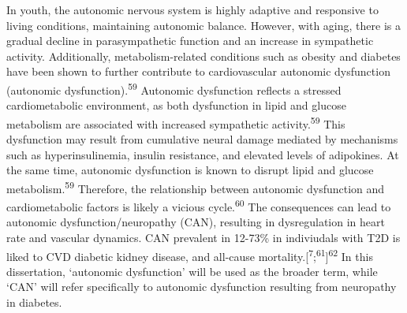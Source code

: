 \documentclass[
  letterpaper,
  headsepline=true,
  open=any]{scrbook}
\begin{document}
In youth, the autonomic nervous system is highly adaptive and responsive
to living conditions, maintaining autonomic balance. However, with
aging, there is a gradual decline in parasympathetic function and an
increase in sympathetic activity. Additionally, metabolism-related
conditions such as obesity and diabetes have been shown to further
contribute to cardiovascular autonomic dysfunction (autonomic
dysfunction).\textsuperscript{59} Autonomic dysfunction reflects a
stressed cardiometabolic environment, as both dysfunction in lipid and
glucose metabolism are associated with increased sympathetic
activity.\textsuperscript{59} This dysfunction may result from
cumulative neural damage mediated by mechanisms such as
hyperinsulinemia, insulin resistance, and elevated levels of adipokines.
At the same time, autonomic dysfunction is known to disrupt lipid and
glucose metabolism.\textsuperscript{59} Therefore, the relationship
between autonomic dysfunction and cardiometabolic factors is likely a
vicious cycle.\textsuperscript{60} The consequences can lead to
autonomic dysfunction/neuropathy (CAN), resulting in dysregulation in
heart rate and vascular dynamics. CAN prevalent in 12-73\% in
indiviudals with T2D is liked to CVD diabetic kidney disease, and
all-cause
mortality.{[}\textsuperscript{7};\textsuperscript{61}{]}\textsuperscript{62}
In this dissertation, `autonomic dysfunction' will be used as the
broader term, while `CAN' will refer specifically to autonomic
dysfunction resulting from neuropathy in diabetes.
\end{document}
